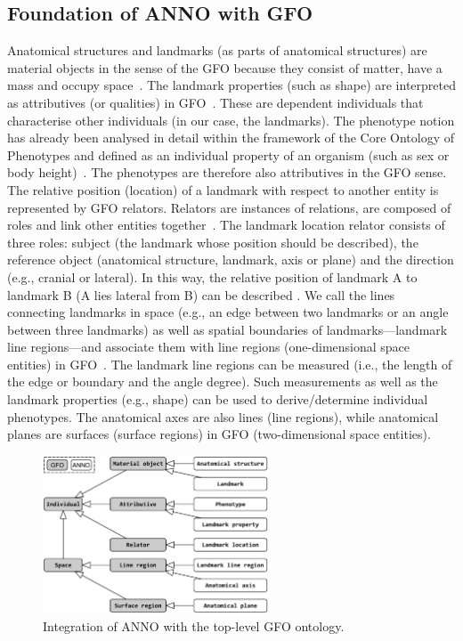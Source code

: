 \documentclass[sw]{iosart2x}
\begin{document}
\subsection{Foundation of ANNO with GFO}

Anatomical structures and landmarks (as parts of anatomical structures) are material objects in the sense of the GFO because they consist of matter, have a mass and occupy space~\citep{gfospace}.
The landmark properties (such as shape) are interpreted as attributives (or qualities) in GFO~\citep{gfoarchitecture}.
These are dependent individuals that characterise other individuals (in our case, the landmarks).
The phenotype notion has already been analysed in detail within the framework of the Core Ontology of Phenotypes and defined as an individual property of an organism (such as sex or body height)~\citep{ontologicalrepresentation}.
The phenotypes are therefore also attributives in the GFO sense.
The relative position (location) of a landmark with respect to another entity is represented by GFO relators.
Relators are instances of relations, are composed of roles and link other entities together~\citep{gfocategory}.
The landmark location relator consists of three roles: subject (the landmark whose position should be described), the reference object (anatomical structure, landmark, axis or plane) and the direction (e.g., cranial or lateral).
In this way, the relative position of landmark A to landmark B (A lies lateral from B) can be described .
We call the lines connecting landmarks in space (e.g., an edge between two landmarks or an angle between three landmarks) as well as spatial boundaries of
landmarks---landmark line regions---and associate them with line regions (one-dimensional space entities) in GFO~\citep{gfospace}.
The landmark line regions can be measured (i.e., the length of the edge or boundary and the angle degree).
Such measurements as well as the landmark properties (e.g., shape) can be used to derive/determine individual phenotypes.
The anatomical axes are also lines (line regions), while anatomical planes are surfaces (surface regions) in GFO (two-dimensional space entities).

\begin{figure}[h]
\includegraphics[width=0.6\textwidth]{img/gfo.pdf}
\caption{Integration of ANNO with the top-level GFO ontology.}\label{fig:gfo}
\end{figure}
\end{document}

